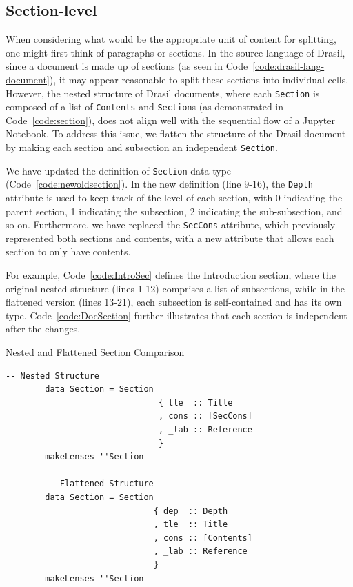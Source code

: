 \subsection{Section-level}
When considering what would be the appropriate unit of content for splitting, 
one might first think of paragraphs or sections. In the source language of 
Drasil, since a document is made up of sections (as seen in 
Code~\ref{code:drasil-lang-document}), it may appear reasonable to split these 
sections into individual cells. However, the nested structure of Drasil 
documents, where each \texttt{Section} is composed of a list of 
\texttt{Contents} and \texttt{Section}s (as demonstrated in 
Code~\ref{code:section}), does not align well with the sequential flow of a 
Jupyter Notebook. To address this issue, we flatten the structure of the Drasil 
document by making each section and subsection an independent 
\texttt{Section}. 

We have updated the definition of \texttt{Section} data type 
(Code~\ref{code:newoldsection}). In the new definition (line 9-16), the 
\texttt{Depth} attribute is used to keep track of the level of each section, 
with 0 indicating the parent section, 1 indicating the subsection, 2 indicating 
the sub-subsection, and so on. Furthermore, we have replaced the 
\texttt{SecCons} attribute, which previously represented both sections and 
contents, with a new attribute that allows each section to only have contents. 

For example, Code~\ref{code:IntroSec} defines the Introduction 
section, where 
the original nested structure (lines 1-12) comprises a list of subsections, 
while in the flattened version (lines 13-21), each subsection is self-contained 
and has its own type. Code~\ref{code:DocSection} further illustrates that each 
section is independent after the changes.

\begin{listing}[h]
	\caption{Nested and Flattened Section Comparison}
	\label{code:newoldsection}
	\begin{lstlisting}[language=haskell1]
		-- Nested Structure
		data Section = Section
							   { tle  :: Title
							   , cons :: [SecCons]
							   , _lab :: Reference
							   }
		makeLenses ''Section
		
		-- Flattened Structure
		data Section = Section 
							  { dep  :: Depth 
							  , tle  :: Title
							  , cons :: [Contents]
							  , _lab :: Reference
							  }
		makeLenses ''Section
	\end{lstlisting}
\end{listing}

